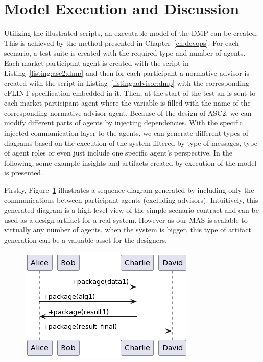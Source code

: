 \section{Model Execution and Discussion}
Utilizing the illustrated scripts, an executable model of the DMP can be created. This is achieved by the method presented in Chapter~\ref{ch:devops}. For each scenario, a test suite is created with the required type and number of agents. Each market participant agent is created with the script in Listing~\ref{listing:asc2:dmp} and then for each participant a normative advisor is created with the script in Listing~\ref{listing:advisor:dmp} with the corresponding eFLINT specification embedded in it. Then, at the start of the test an  is sent to each market participant agent where the  variable is filled with the name of the corresponding normative advisor agent. Because of the design of ASC2, we can modify different parts of agents by injecting dependencies. With the specific injected communication layer to the agents, we can generate different types of diagrams based on the execution of the system filtered by type of messages, type of agent roles or even just include one specific agent's perspective. In the following, some example insights and artifacts created by execution of the model is presented.



Firstly, Figure~\ref{fig:dmp-seq} illustrates a sequence diagram generated by including only the communications between participant agents (excluding advisors). Intuitively, this generated diagram is a high-level view of the simple scenario contract and can be used as a design artifact for a real system. However as our MAS is scalable to virtually any number of agents, when the system is bigger, this type of artifact generation can be a valuable asset for the designers.

\begin{figure}[!tbh]
\centering
\includegraphics[width=.5\textwidth]{ch_cmf/market-sequence.png}
  \label{fig:dmp-seq}
\end{figure}

